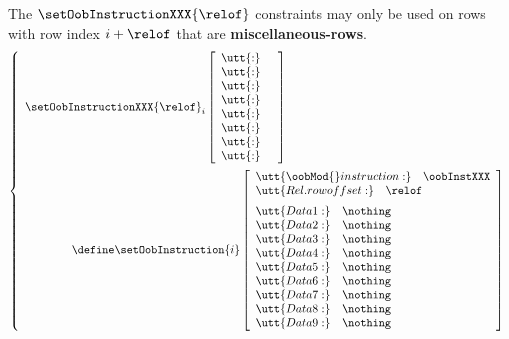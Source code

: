\saNote{} The $\setOobInstructionXXX{\relof}$ constraints may only be used on rows with row index $i + \relof$ that are \textbf{miscellaneous-rows}.
\[
        \left\{ \begin{array}{l}
                \setOobInstructionXXX {\relof} _{i}
                \left[ \begin{array}{ll}
                        \utt{:} &  \\
                        \utt{:} &  \\
                        \utt{:} &  \\
                        \utt{:} &  \\
                        \utt{:} &  \\
                        \utt{:} &  \\
                        \utt{:} &  \\
                        \utt{:} &  \\
                \end{array} \right] \vspace{2mm} \\
                \qquad \qquad \define
                \setOobInstruction{i}
                \left[ \begin{array}{llr}
                        \multicolumn{3}{l}{\utt{\oobMod{} instruction:} \quad \oobInstXXX} \\
                        \multicolumn{3}{l}{\utt{Rel. row offset:}            \quad \relof}         \vspace{2mm} \\
                        \utt{Data 1:} & \nothing  \\
                        \utt{Data 2:} & \nothing  \\
                        \utt{Data 3:} & \nothing  \\
                        \utt{Data 4:} & \nothing  \\
                        \utt{Data 5:} & \nothing  \\
                        \utt{Data 6:} & \nothing  \\
                        \utt{Data 7:} & \nothing  \\
                        \utt{Data 8:} & \nothing  \\
                        \utt{Data 9:} & \nothing  \\
                \end{array} \right] \\
        \end{array} \right.
\]
